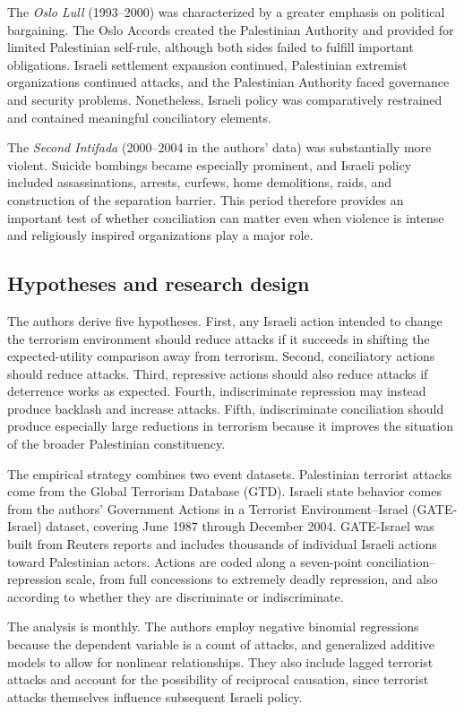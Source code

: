 The \textit{Oslo Lull} (1993--2000) was characterized by a greater emphasis on political bargaining. The Oslo Accords created the Palestinian Authority and provided for limited Palestinian self-rule, although both sides failed to fulfill important obligations. Israeli settlement expansion continued, Palestinian extremist organizations continued attacks, and the Palestinian Authority faced governance and security problems. Nonetheless, Israeli policy was comparatively restrained and contained meaningful conciliatory elements.

The \textit{Second Intifada} (2000--2004 in the authors' data) was substantially more violent. Suicide bombings became especially prominent, and Israeli policy included assassinations, arrests, curfews, home demolitions, raids, and construction of the separation barrier. This period therefore provides an important test of whether conciliation can matter even when violence is intense and religiously inspired organizations play a major role.

\subsection{Hypotheses and research design}

The authors derive five hypotheses. First, any Israeli action intended to change the terrorism environment should reduce attacks if it succeeds in shifting the expected-utility comparison away from terrorism. Second, conciliatory actions should reduce attacks. Third, repressive actions should also reduce attacks if deterrence works as expected. Fourth, indiscriminate repression may instead produce backlash and increase attacks. Fifth, indiscriminate conciliation should produce especially large reductions in terrorism because it improves the situation of the broader Palestinian constituency.

The empirical strategy combines two event datasets. Palestinian terrorist attacks come from the Global Terrorism Database (GTD). Israeli state behavior comes from the authors' Government Actions in a Terrorist Environment--Israel (GATE-Israel) dataset, covering June 1987 through December 2004. GATE-Israel was built from Reuters reports and includes thousands of individual Israeli actions toward Palestinian actors. Actions are coded along a seven-point conciliation--repression scale, from full concessions to extremely deadly repression, and also according to whether they are discriminate or indiscriminate.

The analysis is monthly. The authors employ negative binomial regressions because the dependent variable is a count of attacks, and generalized additive models to allow for nonlinear relationships. They also include lagged terrorist attacks and account for the possibility of reciprocal causation, since terrorist attacks themselves influence subsequent Israeli policy.

